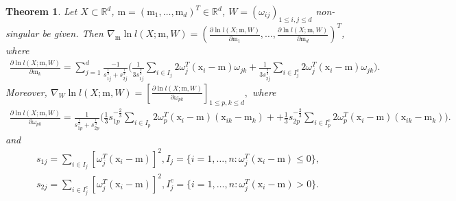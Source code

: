 \documentclass[12pt]{article}
\def\R{\mathbb{R}}
\def\w{\omega}
\def\x{\mathrm{x}}
\def\m{\mathrm{m}}
\newtheorem{theorem}{Theorem}[section]
\theoremstyle{definition}
\begin{document}
\begin{theorem}\label{ther:grad}
Let $X \subset \R^d$, $\m = (\m_1, \ldots, \m_d)^T \in \R^d$, $W = (\w_{ij})_{1 \leq i,j \leq d}$ non-singular be given. 
Then
$\nabla_{\m}  \ln {l}(X;\m,W) = \left(  \frac{\partial \ln {l}(X;\m,W)}{\partial \m_1}, \ldots, \frac{\partial \ln {l}(X;\m,W)}{\partial \m_d} \right)^T$,
where
$$
\begin{array}{l}
\frac{\partial \ln {l}(X;\m,W)}{\partial \m_k} =
\sum \limits_{j=1}^d \frac{-1}{{s}_{1j}^{\frac{1}{3}} + {s}_{2j}^{\frac{1}{3}}} \bigg(
\frac{1}{3 {s}_{1j}^{\frac{2}{3}}} \sum \limits_{i \in I_j} 2 \w_j^T (\x_i - \m)  \w_{jk} + %
\frac{1}{3 {s}_{2j}^{\frac{2}{3}}} \sum \limits_{i \in I_j^c} 2 \w_j^T (\x_i - \m)  \w_{jk}
\bigg).
\end{array}
$$
Moreover,
$
\nabla_{W} \ln {l}(X;\m,W) = \left[ \frac{\partial \ln l(X;\m,W)}{\partial \w_{pk}}  \right]_{1 \leq p,k \leq d},
$
where
$$
\begin{array}{l}
\frac{\partial \ln l(X;\m,W)}{\partial \w_{pk}}  = 
\frac{1}{{s}_{1p}^{\frac{1}{3}} +{s}_{2p}^{\frac{1}{3}}} 
\bigg(
\frac{1}{3} {s}_{1p}^{-\frac{2}{3}}  \sum \limits_{i \in {I}_p} 2 \w^T_p  (\x_i - \m) (\x_{ik} - \m_k) +
+ \frac{1}{3} {s}_{2p}^{-\frac{2}{3}}  \sum \limits_{i \in {I}_p^c} 2 \w^T_p  (\x_i - \m) (\x_{ik} - \m_k) \bigg).
\end{array}
$$
and
$$
\begin{array}{c}
{s}_{1j}= \! \sum\limits_{i \in I_j}[ \w_{j}^T (\x_i-\m)]^2, {I}_j=\{ i = 1,\ldots,n \colon \w_{j}^T (\x_i-\m) \leq 0 \},
\\[1ex]
{s}_{2j}= \! \sum\limits_{i \in I_j^c}[ \w_{j}^T (\x_i-\m)]^2,  {I}_j^c=\{ i = 1,\ldots,n \colon  \w_{j}^T (\x_i-\m) > 0 \}.
\end{array}
$$
\end{theorem}
\end{document}
